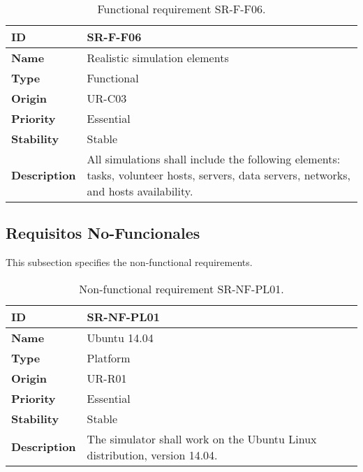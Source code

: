 \begin{center}
\begin{table*}[htbp]
\centering
\begin{tabular}{@{}p{2.5cm} p{9cm}@{}} 
\toprule
\textbf{ID} 				& SR-F-F06\\
\midrule
\textbf{Name} 			& Realistic simulation elements \\
\midrule
\textbf{Type} 			& Functional \\
\midrule
\textbf{Origin} 			& UR-C03 \\
\midrule
\textbf{Priority}		& Essential \\
\midrule
\textbf{Stability} 		& Stable \\
\midrule
\textbf{Description} 	& All simulations shall include the following elements: tasks, volunteer hosts, servers, data servers, networks, and hosts availability. \\
\bottomrule
\end{tabular}
\caption{Functional requirement SR-F-F06.}
\label{tab:srff06}
\end{table*}
\end{center}


\subsection{Requisitos No-Funcionales}

This subsection specifies the non-functional requirements.

\begin{center}
\begin{table*}[htbp]
\centering
\begin{tabular}{@{}p{2.5cm} p{9cm}@{}} 
\toprule
\textbf{ID} 				& SR-NF-PL01\\
\midrule
\textbf{Name} 			& Ubuntu 14.04 \\
\midrule
\textbf{Type} 			& Platform \\
\midrule
\textbf{Origin} 			& UR-R01 \\
\midrule
\textbf{Priority}		& Essential \\
\midrule
\textbf{Stability} 		& Stable \\
\midrule
\textbf{Description} 	& The simulator shall work on the Ubuntu Linux distribution, version 14.04. \\
\bottomrule
\end{tabular}
\caption{Non-functional requirement SR-NF-PL01.}
\label{tab:srnfpl01}
\end{table*}
\end{center}

